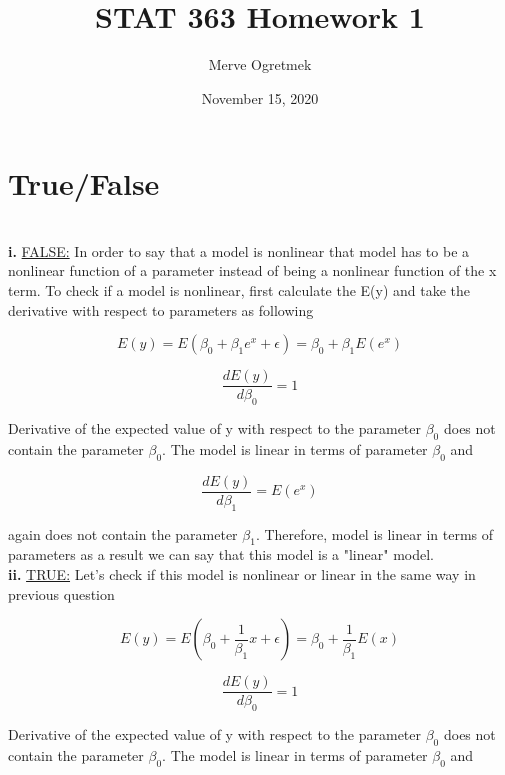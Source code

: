 \documentclass{article}
\title{STAT 363 Homework 1}
\author{Merve Ogretmek}
\date{November 15, 2020}
\begin{document}
\maketitle

\section{True/False}
\\

\textbf{i.} \underline{FALSE:} In order to say that a model is nonlinear that model has to be a nonlinear function of a parameter instead of being a nonlinear function of the x term. To check if a model is nonlinear, first calculate the E(y) and take the derivative with respect to parameters as following 

\begin{equation}
E(y) = E(\beta_0 + \beta_1e^x + \epsilon) = \beta_0 + \beta_1E(e^x) 
\end{equation}

\begin{equation}
\frac{dE(y)}{d\beta_0} = 1
\end{equation}

Derivative of the expected value of y with respect to the parameter $\beta_0$ does not contain the parameter $\beta_0$. The model is linear in terms of parameter $\beta_0$ and 

\begin{equation}
\frac{dE(y)}{d\beta_1} = E(e^x)
\end{equation}

again does not contain the parameter $\beta_1$. Therefore, model is linear in terms of parameters as a result we can say that this model is a "linear" model. 
\\

\textbf{ii.} \underline{TRUE:} Let's check if this model is nonlinear or linear in the same way in previous question

\begin{equation}
E(y) = E(\beta_0 + \frac{1}{\beta_1}x + \epsilon) = \beta_0 + \frac{1}{\beta_1}E(x) 
\end{equation}

\begin{equation}
\frac{dE(y)}{d\beta_0} = 1
\end{equation}

Derivative of the expected value of y with respect to the parameter $\beta_0$ does not contain the parameter $\beta_0$. The model is linear in terms of parameter $\beta_0$ and 
\end{document}

